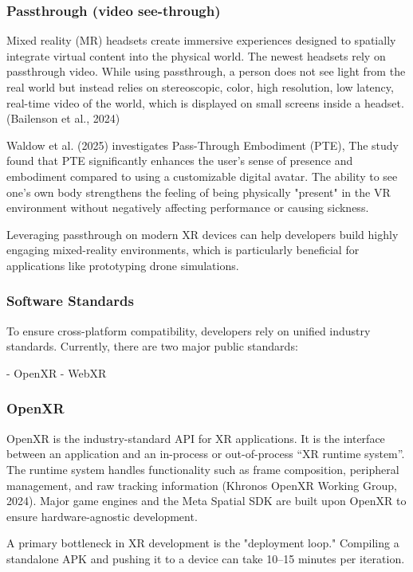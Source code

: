 \subsubsection{Passthrough (video see-through)}

Mixed reality (MR) headsets create immersive experiences designed to spatially integrate virtual content into the physical world. The newest headsets rely on passthrough video. While using passthrough, a person does not see light from the real world but instead relies on stereoscopic, color, high resolution, low latency, real-time video of the world, which is displayed on small screens inside a headset.(Bailenson et al., 2024)

Waldow et al. (2025) investigates Pass-Through Embodiment (PTE), The study found that PTE significantly enhances the user’s sense of presence and embodiment compared to using a customizable digital avatar. The ability to see one’s own body strengthens the feeling of being physically "present" in the VR environment without negatively affecting performance or causing sickness.

Leveraging passthrough on modern XR devices can help developers build highly engaging mixed-reality environments, which is particularly beneficial for applications like prototyping drone simulations.

\subsubsection{Software Standards}

To ensure cross-platform compatibility, developers rely on unified industry standards. Currently, there are two major public standards:

- OpenXR
- WebXR

\subsubsection{OpenXR}


OpenXR is the industry-standard API for XR applications. It is the interface between an application and an in-process or out-of-process “XR runtime system”. The runtime system handles functionality such as frame composition, peripheral management, and raw tracking information (Khronos OpenXR Working Group, 2024). Major game engines and the Meta Spatial SDK are built upon OpenXR to ensure hardware-agnostic development.

A primary bottleneck in XR development is the "deployment loop." Compiling a standalone APK and pushing it to a device can take 10–15 minutes per iteration.

